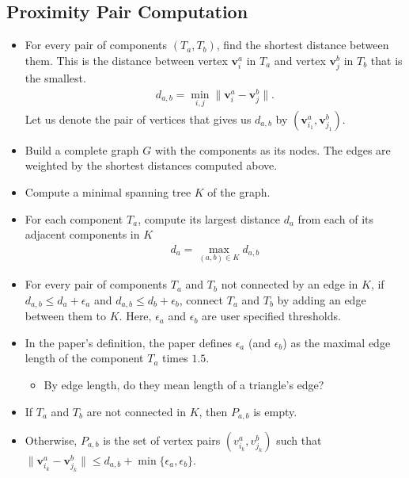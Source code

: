 \documentclass[10pt]{article}
\newcommand{\ve}[1]{\mathbf{#1}}
\begin{document}
\subsection{Proximity Pair Computation}

\begin{itemize}
    \item For every pair of components $(T_a, T_b)$, find the shortest distance between them. This is the distance between vertex $\ve{v}_{i}^a$ in $T_a$ and vertex $\ve{v}_{j}^b$ in $T_b$ that is the smallest.
    \begin{align*}
        d_{a,b} = \min_{i,j} \| \ve{v}_{i}^a - \ve{v}_{j}^b \|.
    \end{align*}
    Let us denote the pair of vertices that gives us $d_{a,b}$ by $(\ve{v}_{i_1}^a, \ve{v}_{j_1}^b)$.

    \item Build a complete graph $G$ with the components as its nodes. The edges are weighted by the shortest distances computed above.
    
    \item Compute a minimal spanning tree $K$ of the graph.
    
    \item For each component $T_a$, compute its largest distance $d_a$ from each of its adjacent components in $K$
    \begin{align*}
        d_a = \max_{(a,b) \in K} d_{a,b}
    \end{align*}

    \item For every pair of components $T_a$ and $T_b$ not connected by an edge in $K$, if $d_{a,b} \leq d_a + \epsilon_a$ and $d_{a,b} \leq d_b + \epsilon_b$, connect $T_a$ and $T_b$ by adding an edge between them to $K$. Here, $\epsilon_a$ and $\epsilon_b$ are user specified thresholds.
    
    \item In the paper's definition, the paper defines $\epsilon_a$ (and $\epsilon_b$) as the maximal edge length of the component $T_a$ times $1.5$.
    \begin{itemize}
        \item By edge length, do they mean length of a triangle's edge?
    \end{itemize}

    \item If $T_a$ and $T_b$ are not connected in $K$, then $P_{a,b}$ is empty.
    
    \item Otherwise, $P_{a,b}$ is the set of vertex pairs $(v_{i_k}^a, v_{j_k}^b)$ such that $\| \ve{v}_{i_k}^a - \ve{v}_{j_k}^b \| \leq d_{a,b} + \min\{ \epsilon_a, \epsilon_b \}$.
\end{itemize}
\end{document}
